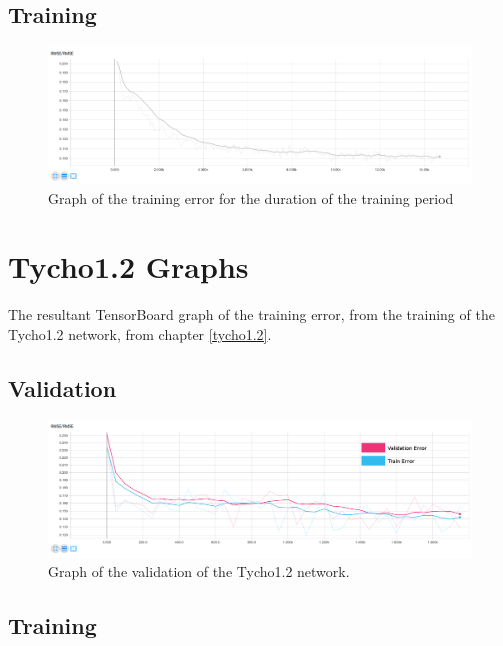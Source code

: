 \documentclass[12pt,a4paper,oneside,oldfontcommands]{memoir}
\begin{document}
\begin{Declaration Of OriginalityOrginality}
\section{Training}
\begin{figure}[H]
  \centering
    \includegraphics[width=\linewidth]{graphs/B/tycho_1_TRAIN_SELECT_ONE_ADAM_0004_sigmoid.png}
    \caption{Graph of the training error for the duration of the training period}
\end{figure}

\chapter{Tycho1.2 Graphs}


The resultant TensorBoard graph of the training error, from the training of the Tycho1.2 network, from chapter \ref{tycho1.2}.
 
 
\section{Validation}

\begin{figure}[H]
  \centering
    \includegraphics[width=\linewidth]{graphs/C/tycho_1_ADAM_0004_relu.png}
    \caption{Graph of the validation of the Tycho1.2 network.}
\end{figure}

\section{Training}


\end{Declaration Of OriginalityOrginality}
\end{document}
